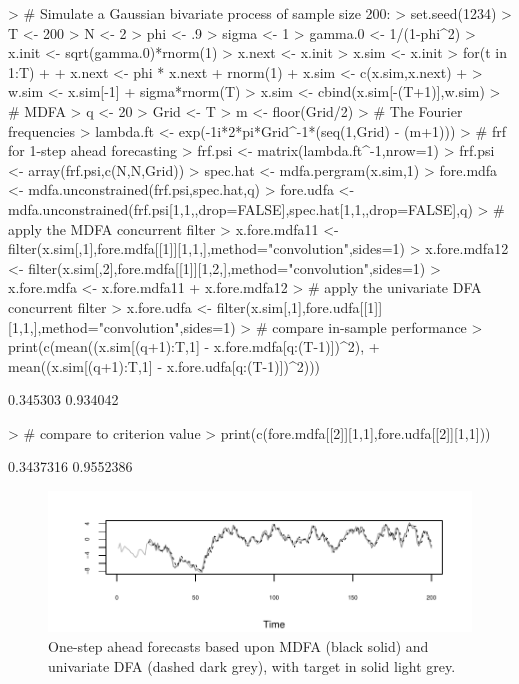 \documentclass[a4paper]{book}
\begin{document}
\begin{Schunk}
\begin{Sinput}
> # Simulate a Gaussian bivariate process of sample size 200:
> set.seed(1234)
> T <- 200
> N <- 2
> phi <- .9
> sigma <- 1
> gamma.0 <- 1/(1-phi^2)
> x.init <- sqrt(gamma.0)*rnorm(1)
> x.next <- x.init
> x.sim <- x.init
> for(t in 1:T)
+ {
+ 	x.next <- phi * x.next + rnorm(1)
+ 	x.sim <- c(x.sim,x.next)
+ }
> w.sim <- x.sim[-1] + sigma*rnorm(T)
> x.sim <- cbind(x.sim[-(T+1)],w.sim)
> # MDFA
> q <- 20
> Grid <- T
> m <- floor(Grid/2)
> # The Fourier frequencies
> lambda.ft <- exp(-1i*2*pi*Grid^{-1}*(seq(1,Grid) - (m+1)))
> # frf for 1-step ahead forecasting
> frf.psi <- matrix(lambda.ft^{-1},nrow=1) %
> frf.psi <- array(frf.psi,c(N,N,Grid))
> spec.hat <- mdfa.pergram(x.sim,1)	
> fore.mdfa <- mdfa.unconstrained(frf.psi,spec.hat,q)
> fore.udfa <- mdfa.unconstrained(frf.psi[1,1,,drop=FALSE],spec.hat[1,1,,drop=FALSE],q)
> # apply the MDFA concurrent filter
> x.fore.mdfa11 <- filter(x.sim[,1],fore.mdfa[[1]][1,1,],method="convolution",sides=1)
> x.fore.mdfa12 <- filter(x.sim[,2],fore.mdfa[[1]][1,2,],method="convolution",sides=1)
> x.fore.mdfa <- x.fore.mdfa11 + x.fore.mdfa12 
> # apply the univariate DFA concurrent filter
> x.fore.udfa <- filter(x.sim[,1],fore.udfa[[1]][1,1,],method="convolution",sides=1)
> # compare in-sample performance
> print(c(mean((x.sim[(q+1):T,1] - x.fore.mdfa[q:(T-1)])^2),
+ 	mean((x.sim[(q+1):T,1] - x.fore.udfa[q:(T-1)])^2)))
\end{Sinput}
\begin{Soutput}
[1] 0.345303 0.934042
\end{Soutput}
\begin{Sinput}
> # compare to criterion value
> print(c(fore.mdfa[[2]][1,1],fore.udfa[[2]][1,1]))
\end{Sinput}
\begin{Soutput}
[1] 0.3437316 0.9552386
\end{Soutput}
\end{Schunk}

 

\begin{figure}[htb!]
\begin{center}
\includegraphics[]{mdfa_bimdfa-udfa.pdf}
\caption{One-step ahead forecasts
 based upon MDFA (black solid) and univariate DFA (dashed dark grey), 
 with target in solid light grey.}
\label{fig:easing1}
\end{center}
\end{figure} 
  
\end{document}
